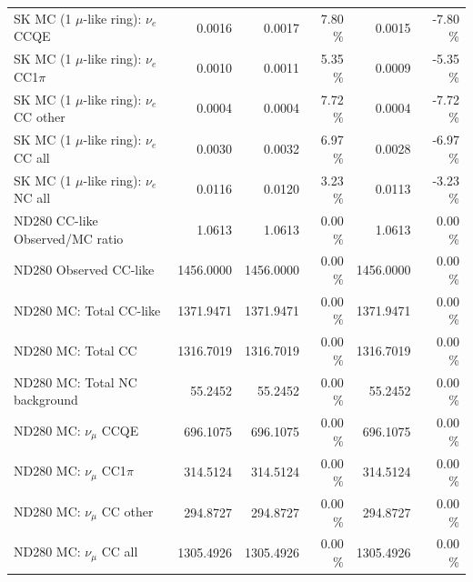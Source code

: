 \begin{table}
\begin{tabular}{| l | r | r  r | r  r |}
                             SK MC (1 $\mu$-like ring): $\nu_{e}$ CCQE &          0.0016 &          0.0017 &  7.80 \%  &          0.0015 & -7.80 \%  \\ 
                         SK MC (1 $\mu$-like ring): $\nu_{e}$ CC1$\pi$ &          0.0010 &          0.0011 &  5.35 \%  &          0.0009 & -5.35 \%  \\ 
                         SK MC (1 $\mu$-like ring): $\nu_{e}$ CC other &          0.0004 &          0.0004 &  7.72 \%  &          0.0004 & -7.72 \%  \\ 
                           SK MC (1 $\mu$-like ring): $\nu_{e}$ CC all &          0.0030 &          0.0032 &  6.97 \%  &          0.0028 & -6.97 \%  \\ 
                           SK MC (1 $\mu$-like ring): $\nu_{e}$ NC all &          0.0116 &          0.0120 &  3.23 \%  &          0.0113 & -3.23 \%  \\ 
\hline
                                       ND280 CC-like Observed/MC ratio &          1.0613 &          1.0613 &  0.00 \%  &          1.0613 &  0.00 \%  \\ 
                                                ND280 Observed CC-like &       1456.0000 &       1456.0000 &  0.00 \%  &       1456.0000 &  0.00 \%  \\ 
                                               ND280 MC: Total CC-like &       1371.9471 &       1371.9471 &  0.00 \%  &       1371.9471 &  0.00 \%  \\ 
                                                    ND280 MC: Total CC &       1316.7019 &       1316.7019 &  0.00 \%  &       1316.7019 &  0.00 \%  \\ 
                                         ND280 MC: Total NC background &         55.2452 &         55.2452 &  0.00 \%  &         55.2452 &  0.00 \%  \\ 
\hline
                                            ND280 MC: $\nu_{\mu}$ CCQE &        696.1075 &        696.1075 &  0.00 \%  &        696.1075 &  0.00 \%  \\ 
                                        ND280 MC: $\nu_{\mu}$ CC1$\pi$ &        314.5124 &        314.5124 &  0.00 \%  &        314.5124 &  0.00 \%  \\ 
                                        ND280 MC: $\nu_{\mu}$ CC other &        294.8727 &        294.8727 &  0.00 \%  &        294.8727 &  0.00 \%  \\ 
                                          ND280 MC: $\nu_{\mu}$ CC all &       1305.4926 &       1305.4926 &  0.00 \%  &       1305.4926 &  0.00 \%  \\ 

\end{tabular}
\end{table}
